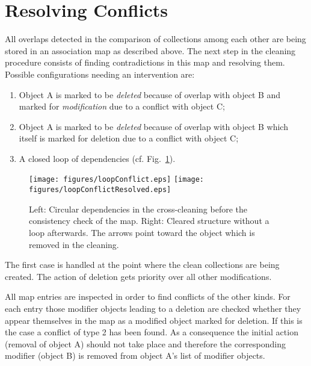 \documentclass{cmspaper}
\begin{document}
\section{Resolving Conflicts}
\label{mapReso}
All overlaps detected in the comparison of collections among each other are
being stored in an association map as described above. The next step in the
cleaning procedure consists of finding contradictions in this map and resolving
them. Possible configurations
needing an intervention are:
\begin{enumerate}
    \item Object A is marked to be \textit{deleted} because of overlap with
	object B and marked for \textit{modification} due to a conflict with
	object C;
    \item Object A is marked to be \textit{deleted} because of overlap with
	object B which itself is marked for deletion due to a conflict with
	object C;
    \item A closed loop of dependencies (cf. Fig.~\ref{fig:loopReso}).
\end{enumerate}

\begin{figure}[hb]
\begin{center}
    \texttt{[image: figures/loopConflict.eps]}
    \hspace*{1.5cm}
    \texttt{[image: figures/loopConflictResolved.eps]}
    \caption{Left: Circular dependencies in the cross-cleaning before the
    consistency check of the map. Right: Cleared structure without a loop
    afterwards. The arrows point toward the object which is removed in the
    cleaning.}
    \label{fig:loopReso}
\end{center}
\end{figure}

The first case is handled at the point where the clean collections are
being created. The action of deletion gets priority over all other
modifications.

All map entries are inspected in order to find conflicts of the other kinds.
For each entry those modifier objects leading to a deletion are checked whether
they appear themselves in the map as a modified object marked for deletion. If
this is the case a conflict of type 2 has been found. As a consequence the
initial action (removal of object A)  should not take place and  therefore the
corresponding modifier (object B) is removed from object A's list of modifier
objects.
\end{document}

